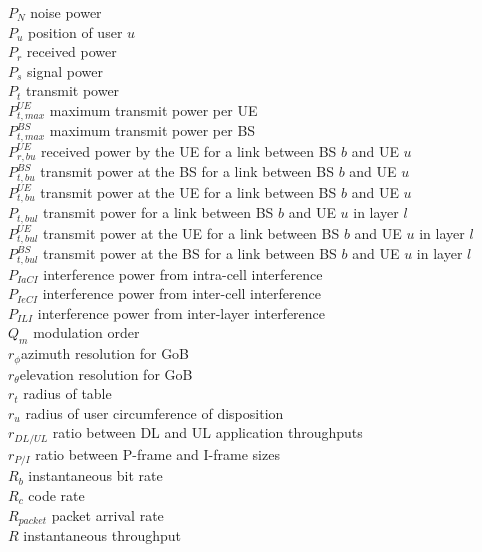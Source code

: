 $P_N$ \mytab noise power \\
$P_u$ \mytab position of user $u$ \\
$P_r$ \mytab received power \\
$P_s$ \mytab signal power \\
$P_t$ \mytab transmit power \\
$P_{t, max}^{UE}$ \mytab maximum transmit power per UE\\
$P_{t, max}^{BS}$ \mytab maximum transmit power per BS \\
$P_{r, bu}^{UE}$ \mytab received power by the UE for a link between BS $b$ and UE $u$ \\
$P_{t, bu}^{BS}$ \mytab transmit power at the BS for a link between BS $b$ and UE $u$ \\
$P_{t, bu}^{UE}$ \mytab transmit power at the UE for a link between BS $b$ and UE $u$ \\
$P_{t, bul}$ \mytab transmit power for a link between BS $b$ and UE $u$ in layer $l$ \\
$P_{t, bul}^{UE}$ \mytab transmit power at the UE for a link between BS $b$ and UE $u$ in layer $l$ \\
$P_{t, bul}^{BS}$ \mytab transmit power at the BS for a link between BS $b$ and UE $u$ in layer $l$ \\
$P_{IaCI}$ \mytab interference power from intra-cell interference \\
$P_{IeCI}$ \mytab interference power from inter-cell interference \\
$P_{ILI}$ \mytab interference power from inter-layer interference \\
$Q_m$ \mytab modulation order \\
$r_\phi$\mytab azimuth resolution for \acs{GoB} \\
$r_\theta$\mytab elevation resolution for \acs{GoB} \\
$r_t$ \mytab radius of table \\
$r_u$ \mytab radius of user circumference of disposition\\
$r_{DL/UL}$ \mytab ratio between \acs{DL} and \acs{UL} application throughputs\\
$r_{P/I}$ \mytab ratio between P-frame and I-frame sizes\\
$R_b$ \mytab instantaneous bit rate \\
$R_c$ \mytab code rate \\
$R_{packet}$ \mytab packet arrival rate \\
$R$ \mytab instantaneous throughput \\
